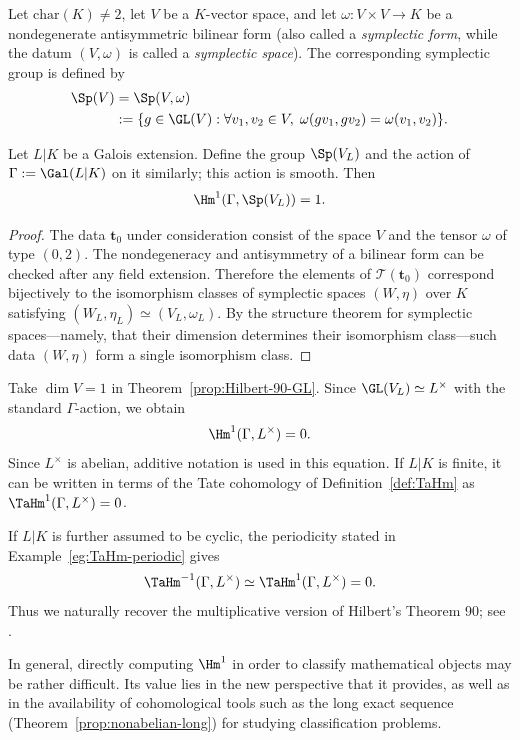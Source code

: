 \begin{theorem}
	Let $\mathrm{char}(K)\neq2$, let $V$ be a $K$-vector space, and let
	$\omega:V\times V\to K$ be a nondegenerate antisymmetric bilinear form
	(also called a \emph{symplectic form}, while the datum $(V,\omega)$ is
	called a \emph{symplectic space}). The corresponding symplectic group is
	defined by
	\begin{align*}
		\Sp(V)&=\Sp(V,\omega)\\
		&:=\{g\in\GL(V):\forall v_1,v_2\in V,\;
		\omega(gv_1,gv_2)=\omega(v_1,v_2)\}.
	\end{align*}

	Let $L|K$ be a Galois extension. Define the group $\Sp(V_L)$ and the
	action of $\Gamma:=\Gal(L|K)$ on it similarly; this action is smooth. Then
	\[
	\Hm^1(\Gamma,\Sp(V_L))=1.
	\]
\end{theorem}
\begin{proof}
	The data $\mathbf{t}_0$ under consideration consist of the space $V$ and
	the tensor $\omega$ of type $(0,2)$. The nondegeneracy and antisymmetry of
	a bilinear form can be checked after any field extension. Therefore the
	elements of $\mathscr{T}(\mathbf{t}_0)$ correspond bijectively to the
	isomorphism classes of symplectic spaces $(W,\eta)$ over $K$ satisfying
	$(W_L,\eta_L)\simeq(V_L,\omega_L)$. By the structure theorem for
	symplectic spaces---namely, that their dimension determines their
	isomorphism class---such data $(W,\eta)$ form a single isomorphism class.
\end{proof}

\begin{example}\label{eg:multiplicative-90-finite}
	Take $\dim V=1$ in Theorem~\ref{prop:Hilbert-90-GL}. Since
	$\GL(V_L)\simeq L^\times$ with the standard $\Gamma$-action, we obtain
	\[
	\Hm^1(\Gamma,L^\times)=0.
	\]
	Since $L^\times$ is abelian, additive notation is used in this equation.
	If $L|K$ is finite, it can be written in terms of the Tate cohomology of
	Definition~\ref{def:TaHm} as $\TaHm^1(\Gamma,L^\times)=0$.

	If $L|K$ is further assumed to be cyclic, the periodicity stated in
	Example~\ref{eg:TaHm-periodic} gives
	\[
	\TaHm^{-1}(\Gamma,L^\times)
	\simeq\TaHm^1(\Gamma,L^\times)=0.
	\]
	Thus we naturally recover the multiplicative version of Hilbert's Theorem
	90; see \cite[Theorem 9.6.9]{Li1}.
\end{example}

In general, directly computing $\Hm^1$ in order to classify mathematical
objects may be rather difficult. Its value lies in the new perspective that
it provides, as well as in the availability of cohomological tools such as
the long exact sequence (Theorem~\ref{prop:nonabelian-long}) for studying
classification problems.
